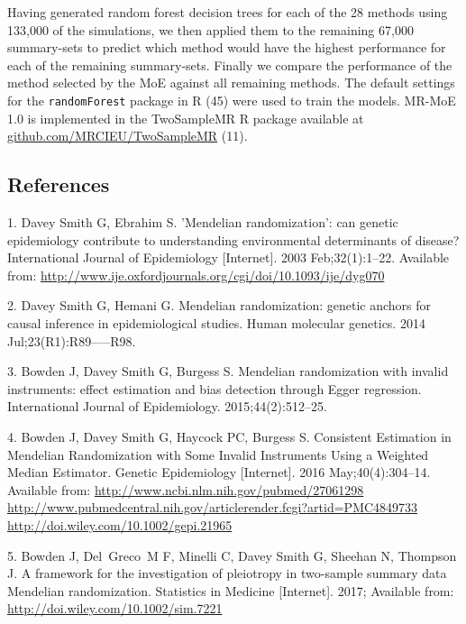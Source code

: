 \documentclass[]{article}
\begin{document}
Having generated random forest decision trees for each of the 28 methods
using 133,000 of the simulations, we then applied them to the remaining
67,000 summary-sets to predict which method would have the highest
performance for each of the remaining summary-sets. Finally we compare
the performance of the method selected by the MoE against all remaining
methods. The default settings for the \texttt{randomForest} package in R
(45) were used to train the models. MR-MoE 1.0 is implemented in the
TwoSampleMR R package available at
\href{https://github.com/MRCIEU/TwoSampleMR}{github.com/MRCIEU/TwoSampleMR}
(11).

\subsection{References}\label{references}

\raggedright

\hypertarget{refs}{}
\hypertarget{ref-DaveySmith2003}{}
1. Davey Smith G, Ebrahim S. 'Mendelian randomization': can genetic
epidemiology contribute to understanding environmental determinants of
disease? International Journal of Epidemiology {[}Internet{]}. 2003
Feb;32(1):1--22. Available from:
\url{http://www.ije.oxfordjournals.org/cgi/doi/10.1093/ije/dyg070}

\hypertarget{ref-DaveySmithHemani2014}{}
2. Davey Smith G, Hemani G. Mendelian randomization: genetic anchors for
causal inference in epidemiological studies. Human molecular genetics.
2014 Jul;23(R1):R89-----R98.

\hypertarget{ref-Bowden2015}{}
3. Bowden J, Davey Smith G, Burgess S. Mendelian randomization with
invalid instruments: effect estimation and bias detection through Egger
regression. International Journal of Epidemiology. 2015;44(2):512--25.

\hypertarget{ref-Bowden2016b}{}
4. Bowden J, Davey Smith G, Haycock PC, Burgess S. Consistent Estimation
in Mendelian Randomization with Some Invalid Instruments Using a
Weighted Median Estimator. Genetic Epidemiology {[}Internet{]}. 2016
May;40(4):304--14. Available from:
\href{http://www.ncbi.nlm.nih.gov/pubmed/27061298\%20http://www.pubmedcentral.nih.gov/articlerender.fcgi?artid=PMC4849733\%20http://doi.wiley.com/10.1002/gepi.21965}{http://www.ncbi.nlm.nih.gov/pubmed/27061298 http://www.pubmedcentral.nih.gov/articlerender.fcgi?artid=PMC4849733 http://doi.wiley.com/10.1002/gepi.21965}

\hypertarget{ref-Bowden2017}{}
5. Bowden J, Del~Greco~M F, Minelli C, Davey Smith G, Sheehan N,
Thompson J. A framework for the investigation of pleiotropy in
two-sample summary data Mendelian randomization. Statistics in Medicine
{[}Internet{]}. 2017; Available from:
\url{http://doi.wiley.com/10.1002/sim.7221}
\end{document}
